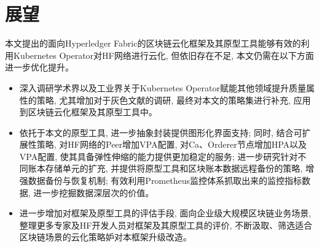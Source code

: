 \section{展望}

本文提出的面向Hyperledger Fabric的区块链云化框架及其原型工具能够有效的利用Kubernetes Operator对HF网络进行云化, 但依旧存在不足, 本文仍需在以下方面进一步优化提升。

\begin{itemize}[itemindent=2em]
    \item 深入调研学术界以及工业界关于Kubernetes Operator赋能其他领域提升质量属性的策略, 尤其增加对于灰色文献的调研, 最终对本文的策略集进行补充, 应用到区块链云化框架及其原型工具中。

    \item 依托于本文的原型工具, 进一步抽象封装提供图形化界面支持; 同时, 结合可扩展性策略, 对HF网络的Peer增加VPA配置, 对Ca、Orderer节点增加HPA以及VPA配置, 使其具备弹性伸缩的能力提供更加稳定的服务; 进一步研究针对不同账本存储单元的扩充, 并提供将原型工具和区块账本数据远程备份的策略, 增强数据备份与恢复机制; 有效利用Prometheus监控体系抓取出来的监控指标数据, 进一步挖掘数据深层次的价值。 

    \item 进一步增加对框架及原型工具的评估手段, 面向企业级大规模区块链业务场景, 整理更多专家及HF开发人员对框架及其原型工具的评价, 不断汲取、筛选适合区块链场景的云化策略妒对本框架升级改造。 

\end{itemize}
